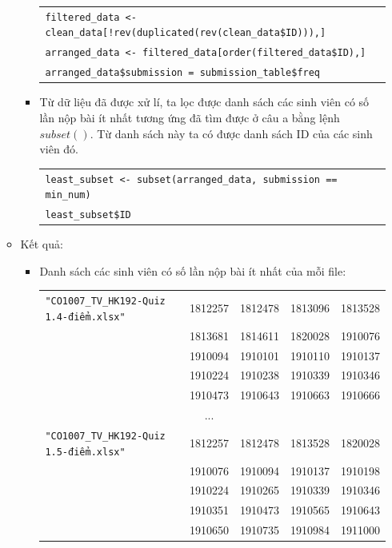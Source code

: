 \documentclass[a4paper]{article}
\theoremstyle{definition}
\begin{document}
\begin{enumerate}[a)]
\begin{itemize}
\begin{itemize}
            \begin{center}
                \begin{tabular}{p{13cm}}
                    \texttt{filtered\_data <- clean\_data[!rev(duplicated(rev(clean\_data\$ID))),]}\\
                    \texttt{arranged\_data <- filtered\_data[order(filtered\_data\$ID),]}\\
                    \texttt{arranged\_data\$submission = submission\_table\$freq}
                \end{tabular}
            \end{center}
            \item Từ dữ liệu đã được xử lí, ta lọc được danh sách các sinh viên có số lần nộp bài ít nhất tương ứng đã tìm được ở câu a bằng lệnh $subset()$. Từ danh sách này ta có được danh sách ID của các sinh viên đó.
            \begin{center}
                \begin{tabular}{p{13cm}}
                    \texttt{least\_subset <- subset(arranged\_data, submission == min\_num)}\\
                    \texttt{least\_subset\$ID}
                \end{tabular}
            \end{center}
        \end{itemize}
        \item Kết quả:
        \begin{itemize}
            \item Danh sách các sinh viên có số lần nộp bài ít nhất của mỗi file:
            \begin{center}
                \begin{tabular}{l c c c c}
                     \texttt{"CO1007\_TV\_HK192-Quiz 1.4-điểm.xlsx"} & 1812257 & 1812478 & 1813096 & 1813528 \\ & 1813681 & 1814611 & 1820028 & 1910076 \\ & 1910094 & 1910101 & 1910110 & 1910137 \\ & 1910224 & 1910238 & 1910339 & 1910346 \\ & 1910473 & 1910643 & 1910663 & 1910666 \\
                     & ...\\
                     \texttt{"CO1007\_TV\_HK192-Quiz 1.5-điểm.xlsx"} & 1812257 & 1812478 & 1813528 & 1820028 \\ & 1910076 & 1910094 & 1910137 & 1910198 \\ & 1910224 & 1910265 & 1910339 & 1910346 \\ & 1910351 & 1910473 & 1910565 & 1910643 \\ & 1910650 & 1910735 & 1910984 & 1911000\\

\end{tabular}
\end{center}
\end{itemize}
\end{itemize}
\end{enumerate}
\end{document}
